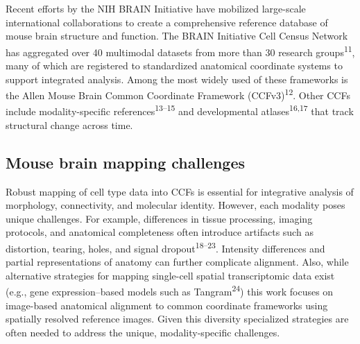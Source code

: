 \documentclass[
  12pt,
]{article}
\begin{document}
Recent efforts by the NIH BRAIN Initiative have mobilized large-scale
international collaborations to create a comprehensive reference
database of mouse brain structure and function. The BRAIN Initiative
Cell Census Network has aggregated over 40 multimodal datasets from more
than 30 research groups\textsuperscript{11}, many of which are
registered to standardized anatomical coordinate systems to support
integrated analysis. Among the most widely used of these frameworks is
the Allen Mouse Brain Common Coordinate Framework
(CCFv3)\textsuperscript{12}. Other CCFs include modality-specific
references\textsuperscript{13--15} and developmental
atlases\textsuperscript{16,17} that track structural change across time.

\subsection{Mouse brain mapping
challenges}\label{mouse-brain-mapping-challenges}

Robust mapping of cell type data into CCFs is essential for integrative
analysis of morphology, connectivity, and molecular identity. However,
each modality poses unique challenges. For example, differences in
tissue processing, imaging protocols, and anatomical completeness often
introduce artifacts such as distortion, tearing, holes, and signal
dropout\textsuperscript{18--23}. Intensity differences and partial
representations of anatomy can further complicate alignment. Also, while
alternative strategies for mapping single-cell spatial transcriptomic
data exist (e.g., gene expression--based models such as
Tangram\textsuperscript{24}) this work focuses on image-based anatomical
alignment to common coordinate frameworks using spatially resolved
reference images. Given this diversity specialized strategies are often
needed to address the unique, modality-specific challenges.
\end{document}
